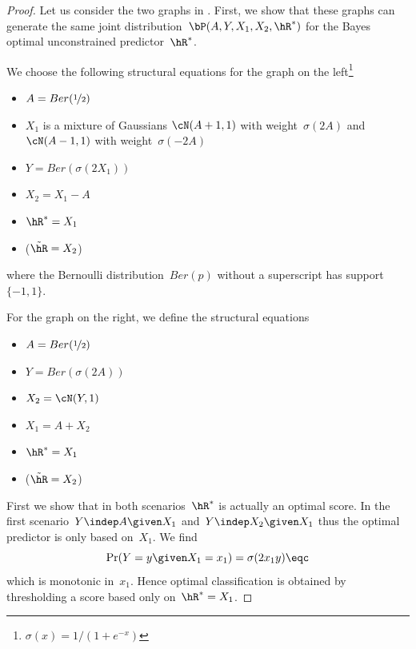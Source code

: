 \begin{proof}
  Let us consider the two graphs in . First, we
  show that these graphs can generate the same joint distribution~$\bP(A, Y,
  X_1, X_2, \hR^*)$ for the Bayes optimal unconstrained predictor~$\hR^*$.

  We choose the following structural equations for the graph on the
  left\footnote{$\sigma(x) = 1 / (1 + e^{-x})$}
  \begin{itemize}
    \item $A = Ber(\nicefrac{1}{2})$
    \item $X_1$ is a mixture of Gaussians $\cN(A+1, 1)$ with weight~$\sigma(2
      A)$ and $\cN(A-1, 1)$ with weight~$\sigma(-2 A)$
    \item $Y = Ber( \sigma(2 X_1) )$
    \item $X_2 = X_1 - A$
    \item $\hR^* =  X_1$
    \item ($\tilde{\hR} = X_2$)
  \end{itemize}
  where the Bernoulli distribution~$Ber(p)$ without a superscript has
  support~$\{-1, 1\}$.

  For the graph on the right, we define the structural equations
  \begin{itemize}
    \item $A = Ber(\nicefrac{1}{2})$
    \item $Y = Ber(\sigma(2 A))$
    \item $X_2 = \cN(Y,1)$
    \item $X_1 = A + X_2$
    \item $\hR^* = X_1$
    \item ($\tilde{\hR} = X_2$)
  \end{itemize}

  First we show that in both scenarios~$\hR^*$ is actually an optimal score.
  In the first scenario~$Y \indep A \given X_1$ and~$Y \indep X_2 \given X_1$
  thus the optimal predictor is only based on~$X_1$. We find
  \begin{equation}\label{eq:YgivenX1}
    \Pr(Y = y \given X_1 = x_1) = \sigma(2 x_1 y) \eqc
  \end{equation}
  which is monotonic in~$x_1$. Hence optimal classification is obtained by
  thresholding a score based only on~$\hR^* = X_1$.


\end{proof}
